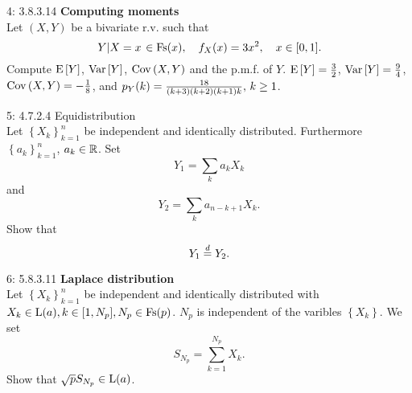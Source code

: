 \documentclass[a4paper,twoside=false,abstract=false,numbers=noenddot,
titlepage=false,headings=small,parskip=half,version=last]{scrartcl}
\begin{document}
\begin{exercise}{4: 3.8.3.14} \textbf{Computing moments} \\
    Let $(X,Y)$ be a bivariate r.v. such that
    \begin{equation}
        \left. Y \middle\vert X=x \right. \in \text{Fs}(x),\quad
        f_X(x)=3x^2,\quad
        x\in [0, 1].
    \end{equation}
    Compute ${\rm E}\,[Y]$, ${\rm Var}\,[Y]$, ${\rm Cov}\,(X, Y)$ and the p.m.f.
    of $Y$.
    \Answer
    ${{\rm E}\,[Y]=\frac{3}{2}}$,
    ${{\rm Var}\,[Y]=\frac{9}{4}}$,
    ${{\rm Cov}\,(X,Y)=-\frac{1}{8}}$, and
    $p_{Y} (k) = \frac{18}{(k+3)(k+2)(k+1)k},\, k \ge 1$.

\end{exercise}
\begin{solution}
\end{solution}
\pagebreak

\begin{exercise}{5: 4.7.2.4} Equidistribution \\
    Let $\left\{{X_k}\right\}_{k=1}^n$ be independent and identically
    distributed. Furthermore $\left\{{a_k}\right\}_{k=1}^n$, $a_k \in \mathbb{R}$. Set
    \begin{equation}
        Y_1 = \sum\limits_k a_k X_k
    \end{equation}
    and
    \begin{equation}
        Y_2 = \sum\limits_k a_{n-k+1} X_k.
    \end{equation}
    Show that
    \begin{equation}
        Y_1 \stackrel{d}{=} Y_2.
    \end{equation}
\end{exercise}
\begin{solution}
\end{solution}
\pagebreak

\begin{exercise}{6: 5.8.3.11} \textbf{Laplace distribution} \\
    Let $\left\{{X_k}\right\}_{k=1}^n$ be independent and identically
    distributed with
    ${X_k \in\text{L}(a),}\, {k\in[1,N_p],}\, {N_p\in \text{Fs}(p)}$.
    $N_p$ is independent of the varibles $\left\{X_k\right\}$. We set
    \begin{equation}
        S_{N_p} = \sum\limits_{k=1}^{N_p}X_k.
    \end{equation}
    Show that $\sqrt{p}S_{N_p}\in\text{L}(a)$.
\end{exercise}
\begin{solution}
\end{solution}
\pagebreak
\end{document}
